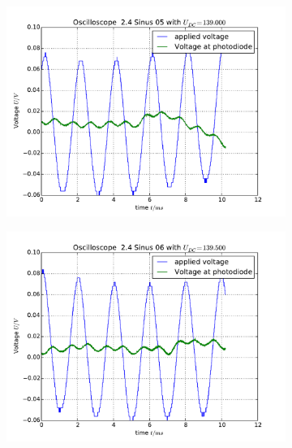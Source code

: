 \begin{figure}
    \begin{subfigure}[b]{\picwidth}
        \includegraphics[width=\textwidth]{analysis/figures/24sinus05}
        \caption{}
    \end{subfigure}\qquad
    \begin{subfigure}[b]{\picwidth}
        \includegraphics[width=\textwidth]{analysis/figures/24sinus06}
        \caption{}
    \end{subfigure}
    \begin{subfigure}[b]{\picwidth}

\end{subfigure}
\end{figure}
